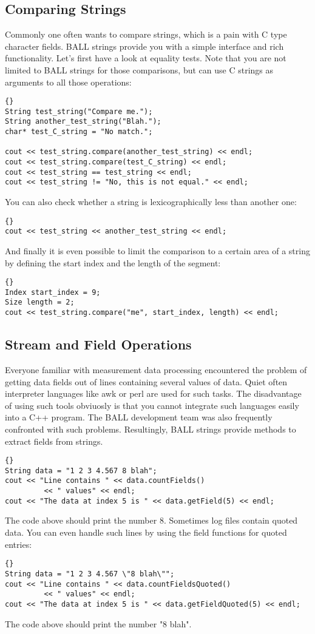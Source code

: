 \subsection{Comparing Strings}

Commonly one often wants to compare strings, which is a pain with C type
character fields. BALL strings provide you with a simple interface and rich
functionality. Let's first have a look at equality tests. Note that you are
not limited to BALL strings for those comparisons, but can use C strings
as arguments to all those operations:
\begin{lstlisting}{}
String test_string("Compare me.");
String another_test_string("Blah.");
char* test_C_string = "No match.";

cout << test_string.compare(another_test_string) << endl;
cout << test_string.compare(test_C_string) << endl;
cout << test_string == test_string << endl;
cout << test_string != "No, this is not equal." << endl;
\end{lstlisting}
You can also check whether a string is lexicographically less than another
one:
\begin{lstlisting}{}
cout << test_string << another_test_string << endl;
\end{lstlisting}
And finally it is even possible to limit the comparison to a certain area of
a string by defining the start index and the length of the segment:
\begin{lstlisting}{}
Index start_index = 9;
Size length = 2;
cout << test_string.compare("me", start_index, length) << endl;
\end{lstlisting}

\subsection{Stream and Field Operations}

Everyone familiar with measurement data processing encountered the problem of
getting data fields out of lines containing several values of data. Quiet
often interpreter languages like awk or perl are used for such tasks. The
disadvantage of using such tools obviuosly is that you cannot integrate such
languages easily into a C++ program. The BALL development team was also
frequently confronted with such problems. Resultingly, BALL strings provide
methods to extract fields from strings.
\begin{lstlisting}{}
String data = "1 2 3 4.567 8 blah";
cout << "Line contains " << data.countFields() 
		 << " values" << endl;
cout << "The data at index 5 is " << data.getField(5) << endl;
\end{lstlisting}
The code above should print the number 8.
Sometimes log files contain quoted data. You can even handle such lines by
using the field functions for quoted entries:
\begin{lstlisting}{}
String data = "1 2 3 4.567 \"8 blah\"";
cout << "Line contains " << data.countFieldsQuoted() 
		 << " values" << endl;
cout << "The data at index 5 is " << data.getFieldQuoted(5) << endl;
\end{lstlisting}
The code above should print the number "8 blah".

